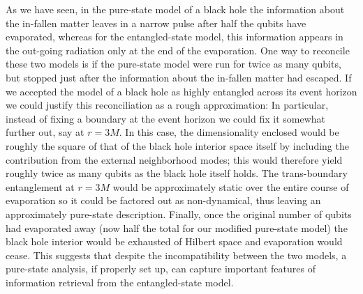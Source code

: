 \documentclass[aps,prl,amsmath,amssymb,floatfix,12pt]{revtex4}
\begin{document}
As we have seen, in the pure-state model of a black hole the information
about the in-fallen matter leaves in a narrow pulse after half the qubits
have evaporated, whereas for the entangled-state model, this
information appears in the out-going radiation only at the end of
the evaporation. One way to reconcile these two models is if the
pure-state model were run for twice as many qubits, but stopped
just after the information about the in-fallen matter had escaped.
If we accepted the model of a black hole as highly entangled
across its event horizon we could justify this reconciliation as a
rough approximation: In particular, instead of fixing a boundary
at the event horizon we could fix it somewhat further out, say at
$r=3M$. In this case, the dimensionality enclosed would be roughly
the square of that of the black hole interior space itself by including
the contribution from the external neighborhood modes; this would
therefore yield roughly twice as many qubits as the black hole itself
holds. The trans-boundary entanglement at $r=3M$ would be approximately
static over the entire course of evaporation so it could be factored out
as non-dynamical, thus leaving an approximately pure-state description.
Finally, once the original number of qubits had evaporated away (now
half the total for our modified pure-state model) the black hole interior
would be exhausted of Hilbert space and evaporation would cease. This 
suggests that despite the incompatibility between the two models, a
pure-state analysis, if properly set up, can capture important features
of information retrieval from the entangled-state model.
\end{document}
